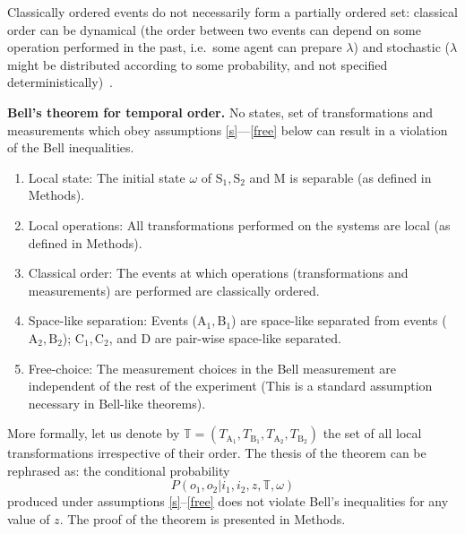 \documentclass[a4paper,11pt]{article}
\newtheorem*{theorem}{Bell's theorem for temporal order}
\begin{document}
Classically ordered events do not necessarily form a partially ordered set: classical order can be dynamical (the order between two events can depend on some operation performed in the past, i.e.\ some agent can prepare $\lambda$) and stochastic ($\lambda$ might be distributed according to some probability, and not specified deterministically)~\cite{Oreshkov2015, abbott2016}. 

\textbf{Bell's theorem for temporal order.} No states, set of transformations
and measurements which obey assumptions  \ref{s}---\ref{free} below can result in a violation of the Bell inequalities.
\begin{enumerate}[1)]
	\item\label{s} {Local state:} The initial state $\omega$ of $\mathrm{S_1, S_2}$ and $\mathrm M$ is separable (as defined in Methods).
	\item\label{ssl} {Local operations:} All transformations performed on the systems are local (as defined in Methods).
	\item\label{to} {Classical order:} The events at which operations (transformations and measurements) are performed are classically ordered.
	\item\label{sep}{Space-like separation:} {Events ($\mathrm{A_1, B_1}$) are space-like separated from events ($\mathrm{A_2, B_2}$); $\mathrm{C_1, C_2}$, and $\mathrm D$ are pair-wise space-like separated.}
	\item\label{free} {Free-choice:} The measurement choices in the Bell measurement are independent of the rest of the experiment (This is a standard assumption necessary in Bell-like theorems).
\end{enumerate}

More formally, let us denote by $\mathbb{T}={(T_\mathrm{A_1}, T_\mathrm{B_1}, T_\mathrm{A_2},  T_\mathrm{B_2})}$ the set of all local transformations irrespective of their order. The thesis of the theorem can be rephrased as: the conditional probability
\begin{equation}
P\left(o_1,o_2|i_1,i_2,z,{\mathbb{T}},\omega\right)
\label{conditional}
\end{equation}
produced under assumptions \ref{s}--\ref{free} does not violate Bell's inequalities for any value of $z$. {The proof of the theorem is presented in Methods.}
\end{document}
